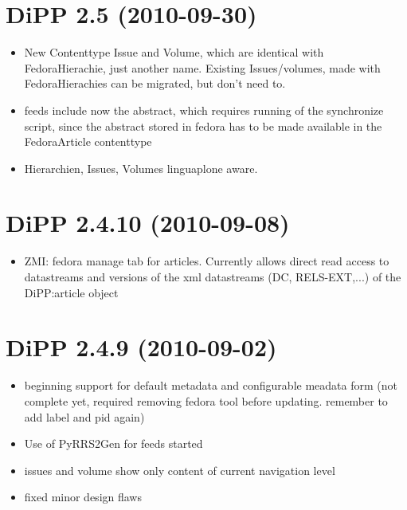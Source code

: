 \documentclass[a4paper,10pt,ngerman]{sphinxmanual}
\begin{document}
\section{DiPP 2.5 (2010-09-30)}
\label{changelog:dipp-2-5-2010-09-30}\begin{itemize}
\item {} 
New Contenttype Issue and Volume, which are identical with
FedoraHierachie, just another name. Existing Issues/volumes, made with
FedoraHierachies can be migrated, but don't need to.

\item {} 
feeds include now the abstract, which requires running of the synchronize
script, since the abstract stored in fedora has to be made available in the
FedoraArticle contenttype

\item {} 
Hierarchien, Issues, Volumes linguaplone aware.

\end{itemize}


\section{DiPP 2.4.10 (2010-09-08)}
\label{changelog:dipp-2-4-10-2010-09-08}\begin{itemize}
\item {} 
ZMI: fedora manage tab for articles. Currently  allows direct read
access to datastreams and versions of the xml datastreams (DC,
RELS-EXT,...) of the DiPP:article object

\end{itemize}


\section{DiPP 2.4.9 (2010-09-02)}
\label{changelog:dipp-2-4-9-2010-09-02}\begin{itemize}
\item {} 
beginning support for default metadata and configurable meadata form
(not complete yet, required removing fedora tool before updating. remember
to add label and pid again)

\item {} 
Use of PyRRS2Gen for feeds started

\item {} 
issues and volume show only content of current navigation level

\item {} 
fixed minor design flaws

\end{itemize}
\end{document}
